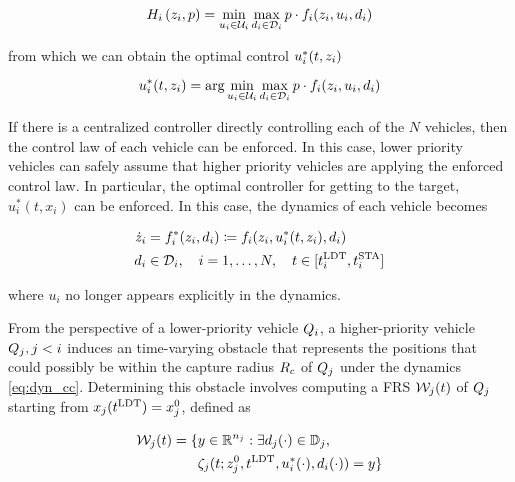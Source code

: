 \begin{equation}
H_i\left(z_i, p\right) = \min_{u_i \in \mathcal{U}_i} \max_{d_i \in \mathcal{D}_i} p \cdot f_i(z_i, u_i, d_i)
\end{equation}

\noindent from which we can obtain the optimal control $u_i^*(t, z_i)$

\begin{equation}
\label{eq:opt_ctrl_i}
\ctrl_i^*(t, \state_i) =  \arg \min_{\ctrl_i \in \cset_i} \max_{\dstb_i \in \dset_i} p \cdot \fdyn_i(\state_i, \ctrl_i, \dstb_i)
\end{equation}

If there is a centralized controller directly controlling each of the $N$ vehicles, then the control law of each vehicle can be enforced. In this case, lower priority vehicles can safely assume that higher priority vehicles are applying the enforced control law. In particular, the optimal controller for getting to the target, $u^*_i(t, x_i)$ can be enforced. In this case, the dynamics of each vehicle becomes 

\begin{equation}
\label{eq:dyn_cc}
\begin{aligned}
\dot \state_i &= \fdyn^*_i (\state_i, \dstb_i) \coloneqq \fdyn_i(\state_i, \ctrl^*_i(t, \state_i), \dstb_i) \\
\dstb_i &\in \dset_i, \quad i = 1,\ldots, N, \quad t \in [\ldt_i, \sta_i]
\end{aligned}
\end{equation}

\noindent where $u_i$ no longer appears explicitly in the dynamics.

From the perspective of a lower-priority vehicle $Q_{i}$, a higher-priority vehicle $Q_{j}, j < i$ induces an time-varying obstacle that represents the positions that could possibly be within the capture radius $R_c$ of $Q_{j}$ under the dynamics \eqref{eq:dyn_cc}. Determining this obstacle involves computing a FRS $\mathcal{W}_j(t)$ of $Q_{j}$ starting from $x_j(t^\text{LDT}) = x_j^0$, defined as 

\begin{equation}
\label{eq:FRS_cc}
\begin{aligned}
\frs_j(t) = \{&y \in \R^{n_j}: \exists d_j(\cdot) \in \dfset_j, \\
&\traj_j(t; \state^0_j, \ldt, \ctrl^*_i(\cdot), \dstb_i(\cdot) )= y\}
\end{aligned}
\end{equation}

